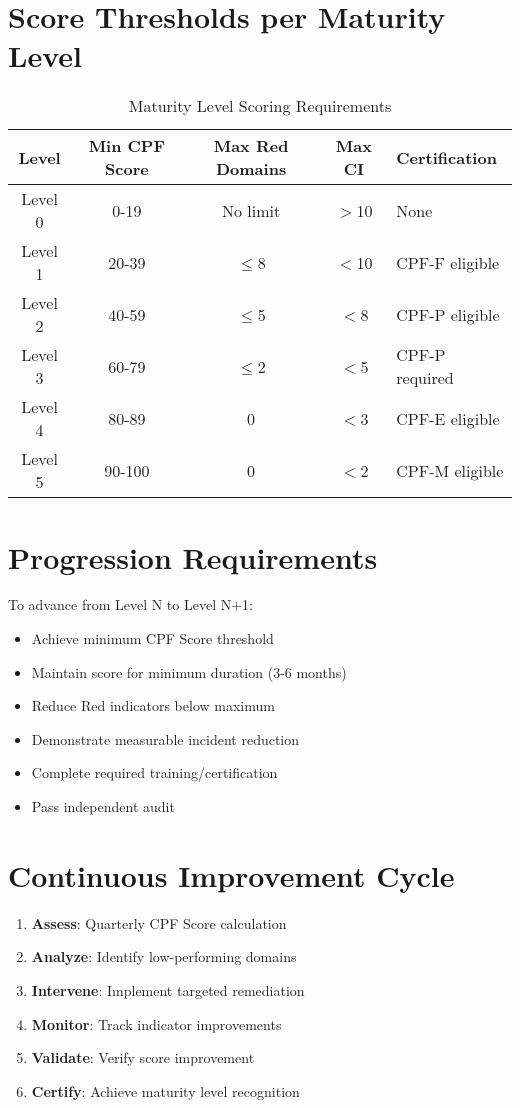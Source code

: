 \documentclass[11pt,a4paper]{article}
\begin{document}
\section{Score Thresholds per Maturity Level}

\begin{table}[h]
\centering
\caption{Maturity Level Scoring Requirements}
\small
\begin{tabular}{ccccl}
\toprule
\textbf{Level} & \textbf{Min CPF Score} & \textbf{Max Red Domains} & \textbf{Max CI} & \textbf{Certification} \\
\midrule
Level 0 & 0-19 & No limit & $>$10 & None \\
Level 1 & 20-39 & $\leq$8 & $<$10 & CPF-F eligible \\
Level 2 & 40-59 & $\leq$5 & $<$8 & CPF-P eligible \\
Level 3 & 60-79 & $\leq$2 & $<$5 & CPF-P required \\
Level 4 & 80-89 & 0 & $<$3 & CPF-E eligible \\
Level 5 & 90-100 & 0 & $<$2 & CPF-M eligible \\
\bottomrule
\end{tabular}
\end{table}

\section{Progression Requirements}

To advance from Level N to Level N+1:

\begin{itemize}
\item Achieve minimum CPF Score threshold
\item Maintain score for minimum duration (3-6 months)
\item Reduce Red indicators below maximum
\item Demonstrate measurable incident reduction
\item Complete required training/certification
\item Pass independent audit
\end{itemize}

\section{Continuous Improvement Cycle}

\begin{enumerate}
\item \textbf{Assess}: Quarterly CPF Score calculation
\item \textbf{Analyze}: Identify low-performing domains
\item \textbf{Intervene}: Implement targeted remediation
\item \textbf{Monitor}: Track indicator improvements
\item \textbf{Validate}: Verify score improvement
\item \textbf{Certify}: Achieve maturity level recognition
\end{enumerate}
\end{document}
